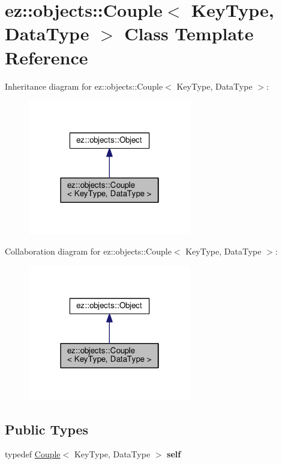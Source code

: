 \hypertarget{classez_1_1objects_1_1Couple}{}\section{ez\+:\+:objects\+:\+:Couple$<$ Key\+Type, Data\+Type $>$ Class Template Reference}
\label{classez_1_1objects_1_1Couple}


Inheritance diagram for ez\+:\+:objects\+:\+:Couple$<$ Key\+Type, Data\+Type $>$\+:
\nopagebreak
\begin{figure}[H]
\begin{center}
\leavevmode
\includegraphics[width=202pt]{classez_1_1objects_1_1Couple__inherit__graph}
\end{center}
\end{figure}


Collaboration diagram for ez\+:\+:objects\+:\+:Couple$<$ Key\+Type, Data\+Type $>$\+:
\nopagebreak
\begin{figure}[H]
\begin{center}
\leavevmode
\includegraphics[width=202pt]{classez_1_1objects_1_1Couple__coll__graph}
\end{center}
\end{figure}
\subsection*{Public Types}
\begin{DoxyCompactItemize}
\item 
\mbox{\label{classez_1_1objects_1_1Couple_a915baba486e88764cfdfa76dacdadf42}} 
typedef \hyperlink{classez_1_1objects_1_1Couple}{Couple}$<$ Key\+Type, Data\+Type $>$ {\bfseries self}
\end{DoxyCompactItemize}
